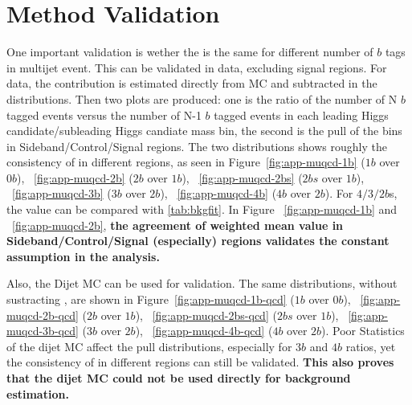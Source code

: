 \section{\muqcd Method Validation}
\label{app:muqcd-study}
One important validation is wether the \muqcd is the same for different number of $b$ tags in multijet event. This can be validated in data, excluding signal regions. For data, the \ttbar contribution is estimated directly from MC and subtracted in the distributions. Then two plots are produced: one is the ratio of the number of N $b$ tagged events versus the number of N-1 $b$ tagged events in each leading Higgs candidate/subleading Higgs candiate mass bin, the second is the pull of the bins in Sideband/Control/Signal regions. The two distributions shows roughly the consistency of \muqcd in different regions, as seen in Figure~\ref{fig:app-muqcd-1b} ($1b$ over $0b$), ~\ref{fig:app-muqcd-2b} ($2b$ over $1b$), ~\ref{fig:app-muqcd-2bs} ($2bs$ over $1b$), ~\ref{fig:app-muqcd-3b} ($3b$ over $2b$), ~\ref{fig:app-muqcd-4b} ($4b$ over $2b$). For $4/3/2b$s, the \muqcd value can be compared with \ref{tab:bkgfit}. In Figure ~\ref{fig:app-muqcd-1b} and ~\ref{fig:app-muqcd-2b}, \textbf{the agreement of \muqcd weighted mean value in Sideband/Control/Signal (especially) regions validates the constant \muqcd assumption in the analysis.}

Also, the Dijet MC can be used for validation. The same distributions, without sustracting \ttbar, are shown in Figure~\ref{fig:app-muqcd-1b-qcd} ($1b$ over $0b$), ~\ref{fig:app-muqcd-2b-qcd} ($2b$ over $1b$), ~\ref{fig:app-muqcd-2bs-qcd} ($2bs$ over $1b$), ~\ref{fig:app-muqcd-3b-qcd} ($3b$ over $2b$), ~\ref{fig:app-muqcd-4b-qcd} ($4b$ over $2b$).  Poor Statistics of the dijet MC affect the pull distributions, especially for $3b$ and $4b$ ratios, yet the consistency of \muqcd in different regions can still be validated. \textbf{This also proves that the dijet MC could not be used directly for background estimation.}

